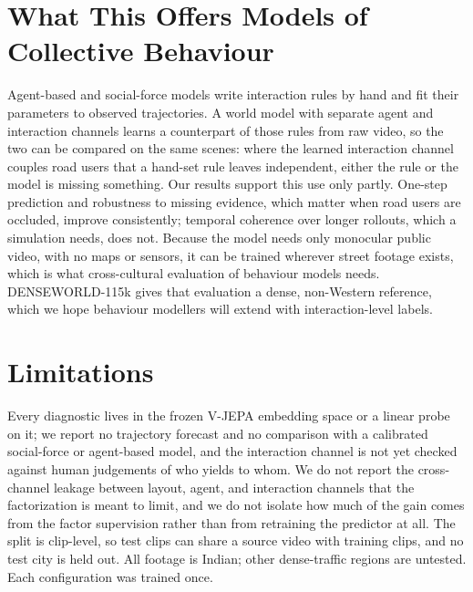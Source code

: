 \documentclass[letterpaper]{article} %
\begin{document}
\section{What This Offers Models of Collective Behaviour}

Agent-based and social-force models write interaction rules by hand and fit their parameters to observed trajectories. A world model with separate agent and interaction channels learns a counterpart of those rules from raw video, so the two can be compared on the same scenes: where the learned interaction channel couples road users that a hand-set rule leaves independent, either the rule or the model is missing something. Our results support this use only partly. One-step prediction and robustness to missing evidence, which matter when road users are occluded, improve consistently; temporal coherence over longer rollouts, which a simulation needs, does not. Because the model needs only monocular public video, with no maps or sensors, it can be trained wherever street footage exists, which is what cross-cultural evaluation of behaviour models needs. DENSEWORLD-115k gives that evaluation a dense, non-Western reference, which we hope behaviour modellers will extend with interaction-level labels.

\section{Limitations}

Every diagnostic lives in the frozen V-JEPA embedding space or a linear probe on it; we report no trajectory forecast and no comparison with a calibrated social-force or agent-based model, and the interaction channel is not yet checked against human judgements of who yields to whom. We do not report the cross-channel leakage between layout, agent, and interaction channels that the factorization is meant to limit, and we do not isolate how much of the gain comes from the factor supervision rather than from retraining the predictor at all. The split is clip-level, so test clips can share a source video with training clips, and no test city is held out. All footage is Indian; other dense-traffic regions are untested. Each configuration was trained once.

{\small

}
\end{document}
